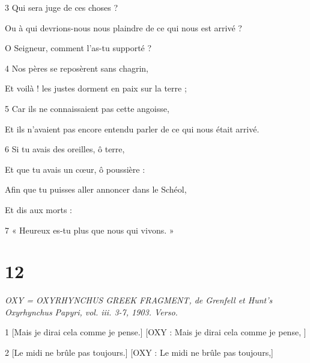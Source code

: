 \par 3 Qui sera juge de ces choses ?

\par Ou à qui devrions-nous nous plaindre de ce qui nous est arrivé ?

\par O Seigneur, comment l'as-tu supporté ?

\par 4 Nos pères se reposèrent sans chagrin,

\par Et voilà ! les justes dorment en paix sur la terre ;

\par 5 Car ils ne connaissaient pas cette angoisse,

\par Et ils n'avaient pas encore entendu parler de ce qui nous était arrivé.

\par 6 Si tu avais des oreilles, ô terre,

\par Et que tu avais un cœur, ô poussière :

\par Afin que tu puisses aller annoncer dans le Schéol,

\par Et dis aux morts :

\par 7 « Heureux es-tu plus que nous qui vivons. »

\chapter{12}

\par \textit{OXY = OXYRHYNCHUS GREEK FRAGMENT, de Grenfell et Hunt's Oxyrhynchus Papyri, vol. iii. 3-7, 1903. Verso.}

\par 1 [Mais je dirai cela comme je pense.] [OXY : Mais je dirai cela comme je pense, ]

\par [Et je parlerai contre toi, ô pays qui prospère toujours.] [OXY : Et je parlerai contre toi, pays qui prospère.]

\par 2 [Le midi ne brûle pas toujours.] [OXY : Le midi ne brûle pas toujours,]

\par [Les rayons du soleil ne donnent pas non plus constamment de lumière.] [OXY : Les rayons du soleil ne donnent pas non plus constamment de lumière.]

